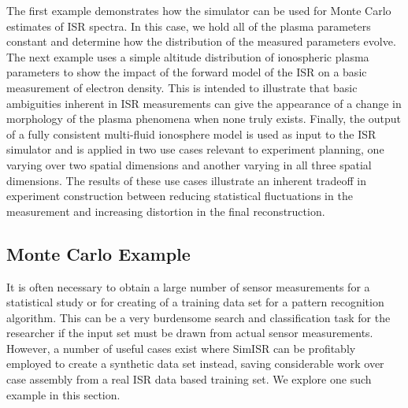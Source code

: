 \documentclass[draft,ras]{agutex}
\begin{document}
\begin{article}
The first example demonstrates how the simulator can be used for Monte Carlo estimates of ISR spectra. In this case, we hold all of the plasma parameters constant and determine how the distribution of the measured parameters evolve. The next example uses a simple altitude distribution of ionospheric plasma parameters to show the impact of the forward model of the ISR on a basic measurement of electron density. This is intended to illustrate that basic ambiguities inherent in ISR measurements can give the appearance of a change in morphology of the plasma phenomena when none truly exists. Finally, the output of a fully consistent multi-fluid ionosphere model is used as input to the ISR simulator and is applied in two use cases relevant to experiment planning, one varying over two spatial dimensions and another varying in all three spatial dimensions. The results of these use cases illustrate an inherent tradeoff in experiment construction between reducing statistical fluctuations in the measurement and increasing distortion in the final reconstruction. 

\subsection{Monte Carlo Example}

It is often necessary to obtain a large number of sensor measurements for a statistical study or for creating of a training data set for a pattern recognition algorithm. This can be a very burdensome search and classification task for the researcher if the input set must be drawn from actual sensor measurements. However, a number of useful cases exist where SimISR can be profitably employed to create a synthetic data set instead, saving considerable work over case assembly from a real ISR data based training set.  We explore one such example in this section.


\end{article}
\end{document}
